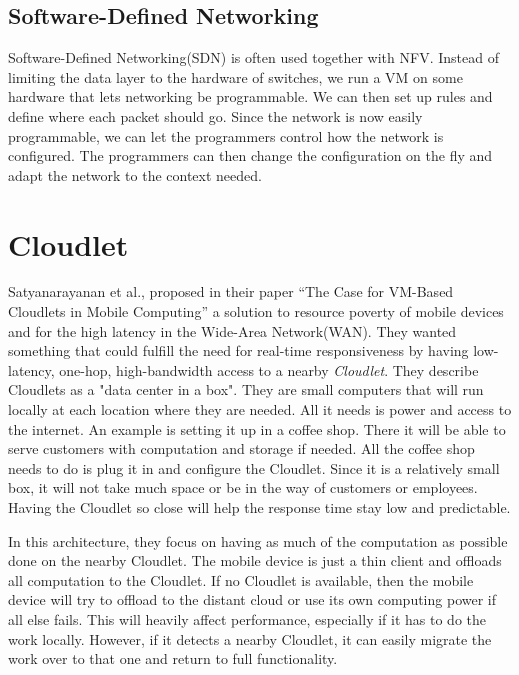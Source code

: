 \subsection{Software-Defined Networking}
Software-Defined Networking(SDN) is often used together with NFV. Instead of limiting the data layer to the hardware of switches, we run a VM on some hardware that lets networking be programmable. We can then set up rules and define where each packet should go. Since the network is now easily programmable, we can let the programmers control how the network is configured. The programmers can then change the configuration on the fly and adapt the network to the context needed.




\section{Cloudlet} \label{section:architecutres_cloudlet} 
Satyanarayanan et al., proposed in their paper “The Case for VM-Based Cloudlets in Mobile Computing”\cite{satyanarayanan_case_2009} a solution to resource poverty of mobile devices and for the high latency in the Wide-Area Network(WAN). They wanted something that could fulfill the need for real-time responsiveness by having low-latency, one-hop, high-bandwidth access to a nearby \textit{Cloudlet}. They describe Cloudlets as a "data center in a box"\cite{satyanarayanan_case_2009}. They are small computers that will run locally at each location where they are needed. All it needs is power and access to the internet. An example is setting it up in a coffee shop. There it will be able to serve customers with computation and storage if needed. All the coffee shop needs to do is plug it in and configure the Cloudlet. Since it is a relatively small box, it will not take much space or be in the way of customers or employees. Having the Cloudlet so close will help the response time stay low and predictable.

In this architecture, they focus on having as much of the computation as possible done on the nearby Cloudlet. The mobile device is just a thin client and offloads all computation to the Cloudlet. If no Cloudlet is available, then the mobile device will try to offload to the distant cloud or use its own computing power if all else fails. This will heavily affect performance, especially if it has to do the work locally. However, if it detects a nearby Cloudlet, it can easily migrate the work over to that one and return to full functionality.
 
